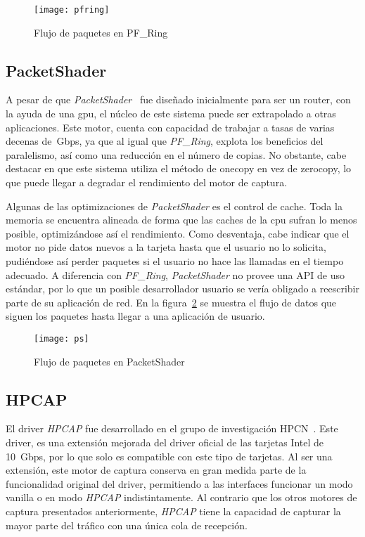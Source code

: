 \begin{figure}[!bth]
\centering
\texttt{[image: pfring]}
\caption{Flujo de paquetes en PF\_Ring}
\label{fig:flow:pfring}
\end{figure}

\newpage
\subsection{PacketShader}
A pesar de que \textit{PacketShader}~\cite{dpdk:packetshader} fue diseñado inicialmente para ser un router, con la ayuda de una \gls{gpu}, el núcleo de este sistema puede ser extrapolado a otras aplicaciones.
Este motor, cuenta con capacidad de trabajar a tasas de varias decenas de~Gbps, ya que al igual que \textit{PF\_Ring}, explota los beneficios del paralelismo, así como una reducción en el número de copias. No obstante, cabe destacar en que este sistema utiliza el método de \gls{onecopy} en vez de \gls{zerocopy}, lo que puede llegar a degradar el rendimiento del motor de captura. 

Algunas de las optimizaciones de \textit{PacketShader} es el control de \gls{cache}. Toda la memoria se encuentra alineada de forma que las \glspl{cache} de la \gls{cpu} sufran lo menos posible, optimizándose así el rendimiento.
Como desventaja, cabe indicar que el motor no pide datos nuevos a la tarjeta hasta que el usuario no lo solicita, pudiéndose así perder paquetes si el usuario no hace las llamadas en el tiempo adecuado. A diferencia con \textit{PF\_Ring}, \textit{PacketShader} no provee una API de uso estándar, por lo que un posible desarrollador usuario se vería obligado a reescribir parte de su aplicación de red. 
En la figura~\ref{fig:flow:ps} se muestra el flujo de datos que siguen los paquetes hasta llegar a una aplicación de usuario.


\begin{figure}[!bth]
\centering
\texttt{[image: ps]}
\caption{Flujo de paquetes en PacketShader}
\label{fig:flow:ps}
\end{figure}

\newpage
\subsection{HPCAP}
El driver \textit{HPCAP} fue desarrollado en el grupo de investigación HPCN~\cite{moreno2012TFM}. Este driver, es una extensión mejorada del driver oficial de las tarjetas Intel de 10~Gbps, por lo que solo es compatible con este tipo de tarjetas. Al ser una extensión, este motor de captura conserva en gran medida parte de la funcionalidad original del driver, permitiendo a las interfaces funcionar un modo \gls{vanilla} o en modo \textit{HPCAP} indistintamente. Al contrario que los otros motores de captura presentados anteriormente, \textit{HPCAP} tiene la capacidad de capturar la mayor parte del tráfico con una única cola de recepción.


